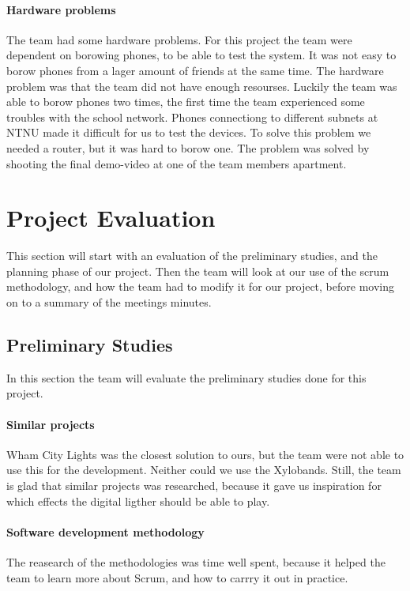 \paragraph{Hardware problems}
The team had some hardware problems. For this project the team were dependent on borowing phones, to be able to test the system. It was not easy to borow phones from a lager amount of friends at the same time. The hardware problem was that the team did not have enough resourses. Luckily the team was able to borow phones two times, the first time the team experienced some troubles with the school network. Phones connectiong to different subnets at NTNU made it difficult for us to test the devices. To solve this problem we needed a router, but it was hard to borow one. The problem was solved by shooting the final demo-video at one of the team members apartment.  
\section{Project Evaluation}
This section will start with an evaluation of the preliminary studies, and the planning phase of our project.  
Then the team will look at our use of the scrum methodology, and how the team had to modify it for our project, before moving on to a summary of the meetings minutes. 

\subsection{Preliminary Studies}
In this section the team will evaluate the preliminary studies done for this project.
\paragraph{Similar projects} 
Wham City Lights was the closest solution to ours, but the team were not able to use this for the development. Neither could we use the Xylobands. Still, the team is glad that similar projects was researched, because it gave us inspiration for which effects the digital ligther should be able to play.

\paragraph{Software development methodology}
The reasearch of the methodologies was time well spent, because it helped the team to learn more about Scrum, and how to carrry it out in practice.

